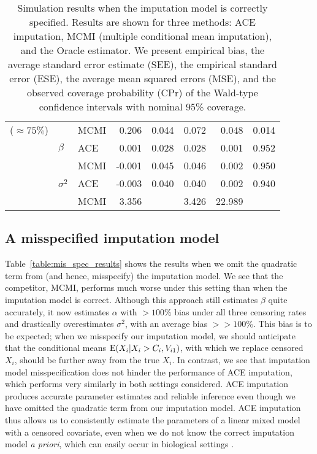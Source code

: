 \documentclass[12pt]{article}
\begin{document}
\begin{table}[!ht]
\begin{tabular}{lllrrrrr}
  ($\approx 75\%$) %
   &  & MCMI & 0.206 & 0.044 & 0.072 & 0.048 & 0.014 \\
   & $\beta$ & ACE & 0.001 & 0.028 & 0.028 & 0.001 & 0.952 \\ 
   &  & MCMI & -0.001 & 0.045 & 0.046 & 0.002 & 0.950 \\
   & $\sigma^2$ & ACE & -0.003 & 0.040 & 0.040 & 0.002 & 0.940 \\ 
   &  & MCMI & 3.356 &  & 3.426 & 22.989 &  \\
   \hline
\end{tabular}
\caption{Simulation results when the imputation model is correctly specified. Results are shown for three methods: ACE imputation, %
MCMI (multiple conditional mean imputation), and the Oracle estimator. We present empirical bias, the average standard error estimate (SEE), the empirical standard error (ESE), the average mean squared errors (MSE), and the observed coverage probability (CPr) of the Wald-type confidence intervals with nominal 95\% coverage.}
\label{table:corr_spec_results}
\end{table}

\subsection{A misspecified imputation model}
\label{sec:sim_B}
Table~\ref{table:mis_spec_results} shows the results when we omit the quadratic term from (and hence, misspecify) the imputation model. We see that the competitor, MCMI, performs much worse under this setting than when the imputation model is correct. Although this approach still estimates $\beta$ quite accurately, it now estimates $\alpha$ with $> 100\%$ bias under all three censoring rates and drastically overestimates $\sigma^2$, with an average bias $>> 100\%$. This bias is to be expected; when we misspecify our imputation model, we should anticipate that the conditional means ${\rm E}(X_i|X_i>C_i,V_{i1})$, with which we replace censored $X_i$, should be further away from the true $X_i$. In contrast, we see that imputation model misspecification does not hinder the performance of ACE imputation, which performs very similarly in both settings considered. ACE imputation produces accurate parameter estimates and reliable inference even though we have omitted the quadratic term from our imputation model.
ACE imputation thus allows us to consistently estimate the parameters of a linear mixed model with a censored covariate, even when we do not know the correct imputation model \textit{a priori}, which can easily occur in biological settings \citep{haber2020bias}. 
\end{document}

